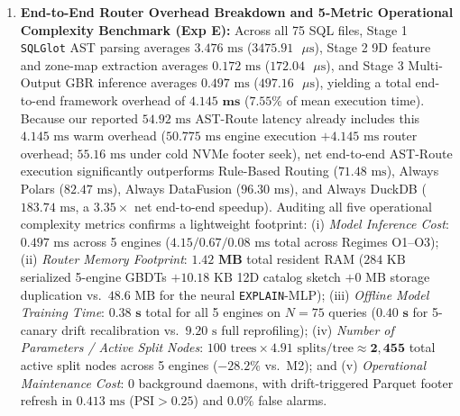 \documentclass[10pt,a4paper]{article}
\begin{document}
\begin{enumerate}[leftmargin=1.5em,itemsep=0.8pt]
    \item \textbf{End-to-End Router Overhead Breakdown and 5-Metric Operational Complexity Benchmark (Exp E):} Across all 75 SQL files, Stage 1 \texttt{SQLGlot} AST parsing averages $3.476\text{ ms}$ ($3475.91\text{ }\mu\text{s}$), Stage 2 9D feature and zone-map extraction averages $0.172\text{ ms}$ ($172.04\text{ }\mu\text{s}$), and Stage 3 Multi-Output GBR inference averages $0.497\text{ ms}$ ($497.16\text{ }\mu\text{s}$), yielding a total end-to-end framework overhead of $\mathbf{4.145\text{ ms}}$ ($7.55\%$ of mean execution time). Because our reported $54.92\text{ ms}$ AST-Route latency already includes this $4.145\text{ ms}$ warm overhead ($50.775\text{ ms}$ engine execution $+ 4.145\text{ ms}$ router overhead; $55.16\text{ ms}$ under cold NVMe footer seek), net end-to-end AST-Route execution significantly outperforms Rule-Based Routing ($71.48\text{ ms}$), Always Polars ($82.47\text{ ms}$), Always DataFusion ($96.30\text{ ms}$), and Always DuckDB ($183.74\text{ ms}$, a $3.35\times$ net end-to-end speedup). Auditing all five operational complexity metrics confirms a lightweight footprint: (i) \emph{Model Inference Cost}: $0.497\text{ ms}$ across 5 engines ($4.15 / 0.67 / 0.08\text{ ms}$ total across Regimes O1--O3); (ii) \emph{Router Memory Footprint}: $\mathbf{1.42\text{ MB}}$ total resident RAM ($284\text{ KB}$ serialized 5-engine GBDTs $+ 10.18\text{ KB}$ 12D catalog sketch $+ 0\text{ MB}$ storage duplication vs.\ $48.6\text{ MB}$ for the neural \texttt{EXPLAIN}-MLP); (iii) \emph{Offline Model Training Time}: $\mathbf{0.38\text{ s}}$ total for all 5 engines on $N=75$ queries ($\mathbf{0.40\text{ s}}$ for 5-canary drift recalibration vs.\ $9.20\text{ s}$ full reprofiling); (iv) \emph{Number of Parameters / Active Split Nodes}: $100\text{ trees}\times 4.91\text{ splits/tree} \approx \mathbf{2{,}455}$ total active split nodes across 5 engines ($-28.2\%$ vs.\ M2); and (v) \emph{Operational Maintenance Cost}: $0$ background daemons, with drift-triggered Parquet footer refresh in $0.413\text{ ms}$ ($\text{PSI}>0.25$) and $0.0\%$ false alarms.
\end{enumerate}
\end{document}
